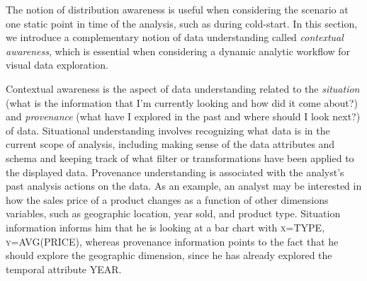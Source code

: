 \par The notion of distribution awareness is useful when considering the scenario at one static point in time of the analysis, such as during cold-start. In this section, we introduce a complementary notion of data understanding called \textit{contextual awareness}, which is essential when considering a dynamic analytic workflow for visual data exploration.
\par Contextual awareness is the aspect of data understanding related to the \textit{situation} (what is the information that I'm currently looking and how did it come about?) and \textit{provenance} (what have I explored in the past and where should I look next?) of data. Situational understanding involves recognizing what data is in the current scope of analysis, including making sense of the data attributes and schema and keeping track of what filter or transformations have been applied to the displayed data. Provenance understanding is associated with the analyst's past analysis actions on the data. As an example, an analyst may be interested in how the sales price of a product changes as a function of other dimensions variables, such as geographic location, year sold, and product type. Situation information informs him that he is looking at a bar chart with \textsc{x=TYPE}, \textsc{y=AVG(PRICE)}, whereas provenance information points to the fact that he should explore the geographic dimension, since he has already explored the temporal attribute \textsc{YEAR}.
